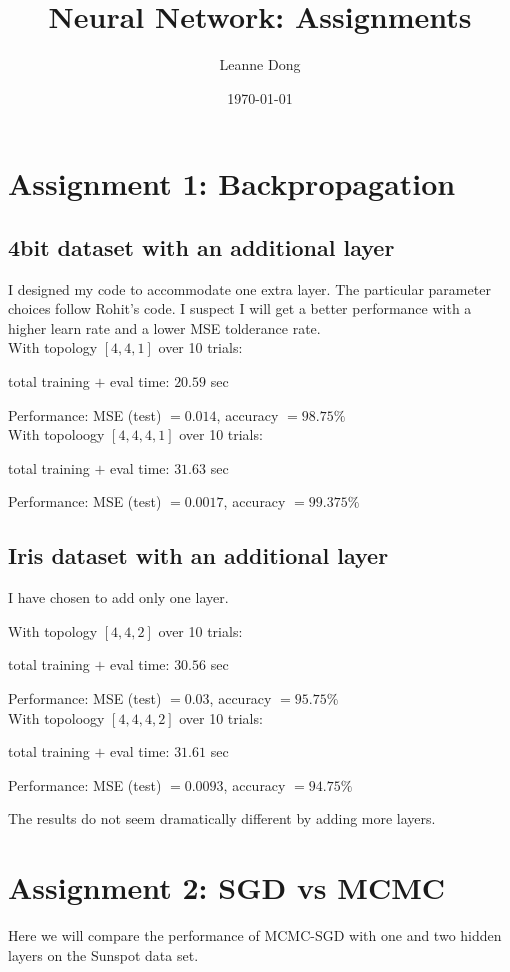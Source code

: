 \documentclass[11pt, oneside, reqno]{amsart}
\title{Neural Network: Assignments}
\author{Leanne Dong
}
\date{\today}
\numberwithin{equation}{section}
\theoremstyle{plain}%
\theoremstyle{definition}
\theoremstyle{remark}
\begin{document}
	\maketitle
\section{Assignment 1: Backpropagation}
\subsection{4bit dataset with an additional layer}
I designed my code to accommodate one extra layer. The particular parameter choices follow Rohit's code. I suspect I will get a better performance with a higher learn rate and a lower MSE tolderance rate.
\\

With topology $[4,4,1]$ over 10 trials:

total training $+$ eval time: $20.59$ sec

Performance: MSE (test) $= 0.014$, accuracy $= 98.75\%$
\\

With  topoloogy $[4,4,4,1]$ over 10 trials:

total training $+$ eval time: $31.63$ sec

Performance: MSE (test) $= 0.0017$, accuracy $= 99.375\%$

\subsection{Iris dataset with an additional layer}

I have chosen to add only one layer.

With topology $[4,4,2]$ over 10 trials:

total training $+$ eval time: $30.56$ sec

Performance: MSE (test) $= 0.03$, accuracy $= 95.75\%$
\\

With  topoloogy $[4,4,4,2]$ over 10 trials:

total training $+$ eval time: $31.61$ sec

Performance: MSE (test) $= 0.0093$, accuracy $= 94.75\%$

The results do not seem dramatically different by adding more layers.

\section{Assignment 2: SGD vs MCMC}
Here we will compare the performance of MCMC-SGD with one and two hidden layers on the Sunspot data set.
\end{document}
